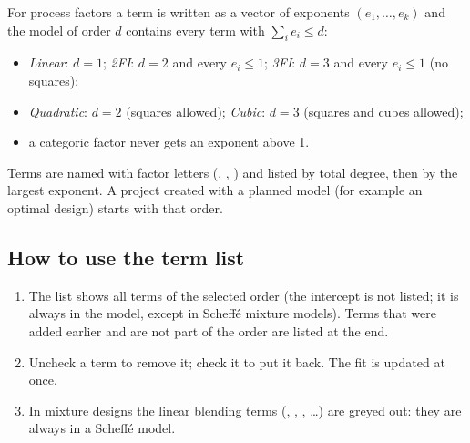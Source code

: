 For process factors a term is written as a vector of exponents $(e_1,\dots,e_k)$ and the model of order
$d$ contains every term with $\sum_i e_i\le d$:
\begin{itemize}
  \item \emph{Linear}: $d=1$; \emph{2FI}: $d=2$ and every $e_i\le 1$; \emph{3FI}: $d=3$ and every
        $e_i\le1$ (no squares);
  \item \emph{Quadratic}: $d=2$ (squares allowed); \emph{Cubic}: $d=3$ (squares and cubes allowed);
  \item a categoric factor never gets an exponent above 1.
\end{itemize}
Terms are named with factor letters (, , ) and listed by total degree, then by the
largest exponent. A project created with a planned model (for example an optimal design) starts with
that order.

\subsection*{How to use the term list}
\begin{enumerate}
  \item The list  shows all terms of the selected order (the
        intercept is not listed; it is always in the model, except in Scheffé mixture models). Terms that
        were added earlier and are not part of the order are listed at the end.
  \item Uncheck a term to remove it; check it to put it back. The fit is updated at once.
  \item In mixture designs the linear blending terms (, , , \dots) are greyed out:
        they are always in a Scheffé model.
\end{enumerate}

